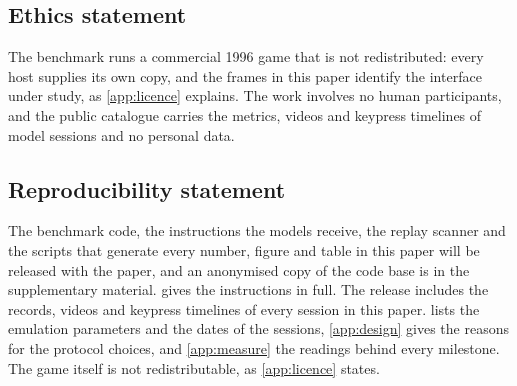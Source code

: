\documentclass{article} %
\begin{document}
\subsection*{Ethics statement}
The benchmark runs a commercial 1996 game that is not redistributed: every host supplies its own copy, and the frames in this paper identify the interface under study, as \cref{app:licence} explains. The work involves no human participants, and the public catalogue carries the metrics, videos and keypress timelines of model sessions and no personal data.

\subsection*{Reproducibility statement}
The benchmark code, the instructions the models receive, the replay scanner and the scripts that generate every number, figure and table in this paper will be released with the paper, and an anonymised copy of the code base is in the supplementary material.  gives the instructions in full. The release includes the records, videos and keypress timelines of every session in this paper.  lists the emulation parameters and the dates of the sessions, \cref{app:design} gives the reasons for the protocol choices, and \cref{app:measure} the readings behind every milestone. The game itself is not redistributable, as \cref{app:licence} states.




\appendix
{}
\end{document}
